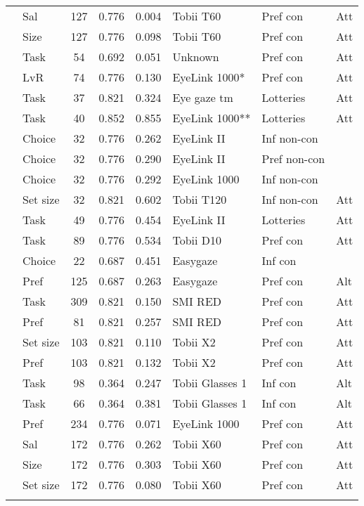 \begin{longtable}{p{5cm}lccclll}
  \cite{peschel2019} & Sal & 127 & 0.776 & 0.004 & Tobii T60 & Pref con & Att \\ 
  \cite{peschel2019} & Size & 127 & 0.776 & 0.098 & Tobii T60 & Pref con & Att \\ 
  \cite{pieters1999} & Task & 54 & 0.692 & 0.051 & Unknown & Pref con & Att \\ 
  \cite{robertson2020} & LvR & 74 & 0.776 & 0.130 & EyeLink 1000* & Pref con & Att \\ 
  \cite{rubaltelli2012} & Task & 37 & 0.821 & 0.324 & Eye gaze tm & Lotteries & Att \\ 
  \cite{schoemann2019} & Task & 40 & 0.852 & 0.855 & EyeLink 1000** & Lotteries & Att \\ 
  \cite{schotter2010a} & Choice & 32 & 0.776 & 0.262 & EyeLink II & Inf non-con &  \\ 
  \cite{schotter2010a} & Choice & 32 & 0.776 & 0.290 & EyeLink II & Pref non-con &  \\ 
  \cite{schotter2012a} & Choice & 32 & 0.776 & 0.292 & EyeLink 1000 & Inf non-con &  \\ 
  \cite{spinks2016a} & Set size & 32 & 0.821 & 0.602 & Tobii T120 & Inf non-con & Att \\ 
  \cite{su2013} & Task & 49 & 0.776 & 0.454 & EyeLink II & Lotteries & Att \\ 
  \cite{turner2014} & Task & 89 & 0.776 & 0.534 & Tobii D10 & Pref con & Att \\ 
  \cite{vanderlaan2015} & Choice & 22 & 0.687 & 0.451 & Easygaze & Inf con &  \\ 
  \cite{vanderlaan2017} & Pref & 125 & 0.687 & 0.263 & Easygaze & Pref con & Alt \\ 
  \cite{vanherpen2011} & Task & 309 & 0.821 & 0.150 & SMI RED & Pref con & Att \\ 
  \cite{vanloo2015} & Pref & 81 & 0.821 & 0.257 & SMI RED & Pref con & Att \\ 
  \cite{vanloo2019} & Set size & 103 & 0.821 & 0.110 & Tobii X2 & Pref con & Att \\ 
  \cite{vanloo2019} & Pref & 103 & 0.821 & 0.132 & Tobii X2 & Pref con & Att \\ 
  \cite{wastlund2015} & Task & 98 & 0.364 & 0.247 & Tobii Glasses 1 & Inf con & Alt \\ 
  \cite{wastlund2015} & Task & 66 & 0.364 & 0.381 & Tobii Glasses 1 & Inf con & Alt \\ 
  \cite{wolfson2017} & Pref & 234 & 0.776 & 0.071 & EyeLink 1000 & Pref con & Att \\ 
  \cite{zuschke2020} & Sal & 172 & 0.776 & 0.262 & Tobii X60 & Pref con & Att \\ 
  \cite{zuschke2020} & Size & 172 & 0.776 & 0.303 & Tobii X60 & Pref con & Att \\ 
  \cite{zuschke2020} & Set size & 172 & 0.776 & 0.080 & Tobii X60 & Pref con & Att \\ 
  \hline
\label{tab:overviewtable}
\end{longtable}
\endgroup
